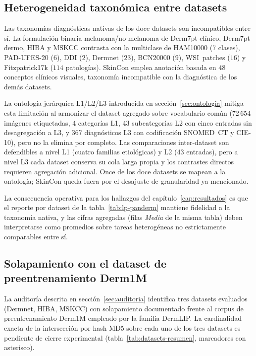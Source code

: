 \subsection{Heterogeneidad taxonómica entre datasets}
\label{sec:lim-taxonomia}

Las taxonomías diagnósticas nativas de los doce datasets son
incompatibles entre sí. La formulación binaria
melanoma/no-melanoma de Derm7pt clínico, Derm7pt dermo, HIBA y
MSKCC contrasta con la multiclase de HAM10000 ($7$ clases),
PAD-UFES-20 ($6$), DDI ($2$), Dermnet ($23$), BCN20000
($9$), WSI~patches ($16$) y Fitzpatrick17k
($114$ patologías). SkinCon emplea anotación basada en
$48$ conceptos clínicos visuales, taxonomía incompatible con la
diagnóstica de los demás datasets.

La ontología jerárquica L1/L2/L3 introducida en
secci\'on~\ref{sec:ontologia} mitiga esta limitación al armonizar el
dataset agregado sobre vocabulario común
($72\,654$ imágenes etiquetadas, $4$ categorías L1, $43$
subcategorías L2 con cinco entradas sin desagregación a L3, y
$367$ diagnósticos L3 con codificación SNOMED~CT y CIE-10), pero
no la elimina por completo. Las comparaciones inter-dataset son
defendibles a nivel L1 (cuatro familias etiológicas) y L2
($43$ entradas), pero a nivel L3 cada dataset conserva su cola
larga propia y los contrastes directos requieren agregación
adicional. Once de los doce datasets se mapean a la ontología;
SkinCon queda fuera por el desajuste de granularidad ya
mencionado.

La consecuencia operativa para los hallazgos del
capítulo~\ref{cap:resultados} es que el reporte por dataset de la
tabla~\ref{tab:lp-panderm} mantiene fidelidad a la taxonomía
nativa, y las cifras agregadas (filas \emph{Media} de la misma
tabla) deben interpretarse como promedios sobre tareas heterogéneas
no estrictamente comparables entre sí.

\subsection{Solapamiento con el dataset de preentrenamiento Derm1M}
\label{sec:lim-leakage}

La auditoría descrita en secci\'on~\ref{sec:auditoria} identifica tres
datasets evaluados (Dermnet, HIBA, MSKCC) con solapamiento
documentado frente al corpus de preentrenamiento Derm1M
empleado por la familia DermLIP. La cardinalidad exacta de la
intersección por hash MD5 sobre cada uno de los tres datasets es
pendiente de cierre experimental
(tabla~\ref{tab:datasets-resumen}, marcadores con asterisco).

